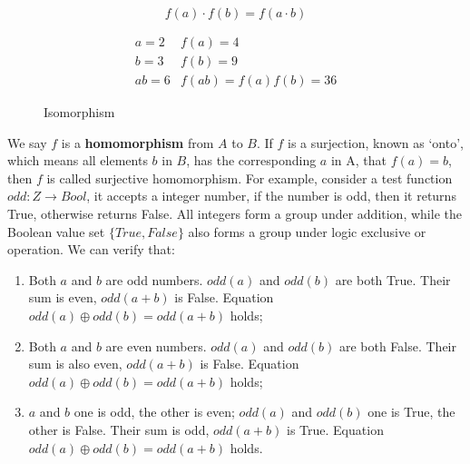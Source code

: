 \documentclass{article}
\begin{document}
\[
f(a) \cdot f(b) = f(a \cdot b)
\]

\begin{figure}[htbp]
\centering
{}
\[
\begin{array}{rl}
a = 2 & f(a) = 4 \\
b = 3 & f(b) = 9 \\
ab = 6 & f(ab) = f(a)f(b) = 36
\end{array}
\]
\caption{Isomorphism}
\label{fig:isomorphism}
\end{figure}

We say $f$ is a \textbf{homomorphism} from $A$ to $B$. If $f$ is a surjection, known as `onto', which means all elements $b$ in $B$, has the corresponding $a$ in A, that $f(a) = b$, then $f$ is called surjective homomorphism. For example, consider a test function $odd: Z \to Bool$, it accepts a integer number, if the number is odd, then it returns True, otherwise returns False. All integers form a group under addition, while the Boolean value set $\{True, False\}$ also forms a group under logic exclusive or operation. We can verify that:

\begin{enumerate}
\item Both $a$ and $b$ are odd numbers. $odd(a)$ and $odd(b)$ are both True. Their sum is even, $odd(a+b)$ is False. Equation $odd(a) \oplus odd(b) = odd(a+b)$ holds;
\item Both $a$ and $b$ are even numbers. $odd(a)$ and $odd(b)$ are both False. Their sum is also even, $odd(a+b)$ is False. Equation $odd(a) \oplus odd(b) = odd(a+b)$ holds;
\item $a$ and $b$ one is odd, the other is even; $odd(a)$ and $odd(b)$ one is True, the other is False. Their sum is odd, $odd(a+b)$ is True. Equation $odd(a) \oplus odd(b) = odd(a+b)$ holds.
\end{enumerate}
\end{document}
